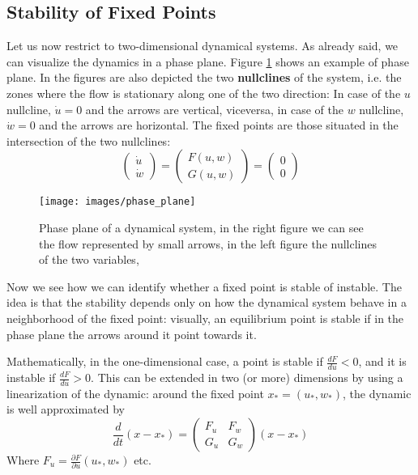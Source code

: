 \documentclass[oneside]{book}
\theoremstyle{definition}
\theoremstyle{plain}
\begin{document}
\subsection{Stability of Fixed Points}
Let us now restrict to two-dimensional dynamical systems. As already said, we can visualize the dynamics in a phase plane.  Figure \ref{fig:phase_plane} shows an example of phase plane.
In the figures  are also depicted the two \textbf{nullclines} of the system, i.e. the zones where the flow is stationary along one of the two direction:
In case of the $u$ nullcline, $\dot{u}=0$ and the arrows are vertical, viceversa, in case of the $w$ nullcline, $\dot{w}=0$ and the arrows are horizontal. 
The fixed points are those situated in the intersection of the two nullclines: 
\[
    \begin{pmatrix}
        \dot{u}\\
        \dot{w}
    \end{pmatrix} =
    \begin{pmatrix}
        F(u,w)\\
        G(u,w)
    \end{pmatrix} =
    \begin{pmatrix}
        0\\
        0
    \end{pmatrix}
\]



\begin{figure}
    \centering
    \texttt{[image: images/phase\_plane]}
    \caption{Phase plane of a dynamical system, in the right figure we can see the flow represented by small arrows, in the left figure the nullclines of the two variables,}
    \label{fig:phase_plane}
\end{figure}
Now we see how we can identify whether a fixed point is stable of instable. The idea is that the stability depends only on how the dynamical system behave in a neighborhood of the fixed point: visually, an equilibrium point is stable if in the phase plane the arrows around it point towards it.

Mathematically, in the one-dimensional case, a point is stable if $\frac{dF}{du} <0$, and it is instable if $\frac{dF}{du}>0$. 
This can be extended in two (or more) dimensions by using a linearization of the dynamic: around the fixed point $x_*=(u_*,w_*)$, the dynamic is well approximated  by
\begin{equation}\label{eqn:linearization}
    \frac{d}{dt} (x- x_*) = 
    \begin{pmatrix}
        F_u & F_w \\
        G_u & G_w
    \end{pmatrix} (x-x_*)
\end{equation}
Where $F_u =\frac{\partial F}{\partial u} (u_*, w_*)$ etc.
\end{document}
